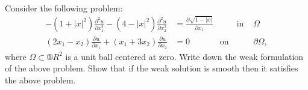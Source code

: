 \documentclass[12pt]{article}					%
\begin{document}
\begin{priklad}[2.]
	Consider the following problem:
	\begin{align*}
		-(1 + |x|^2) \frac{\partial^2 u}{\partial x_1^2} - (4 - |x|^2) \frac{\partial^2 u}{\partial x_2^2} &= \frac{\partial \sqrt{1 - |x|}}{\partial x_1} & \qquad \text{in } & Ω\\
		(2x_1 - x_2) \frac{\partial u}{\partial x_1} + (x_1 + 3x_2) \frac{\partial u}{\partial x_2} &= 0 \qquad & \text{on } & \partial Ω,
	\end{align*}
	where $Ω \subset ®R^2$ is a unit ball centered at zero. Write down the weak formulation of the above problem. Show that if the weak solution is smooth then it satisfies the above problem.

	\begin{reseni}
		
	\end{reseni}
\end{priklad}
\end{document}
